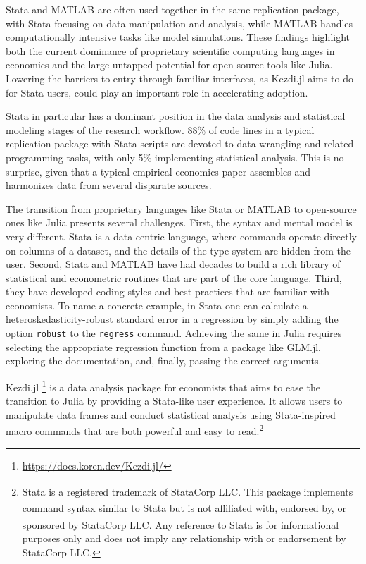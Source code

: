 \documentclass{juliacon}
\begin{document}
Stata and MATLAB are often used together in the same replication package, with Stata focusing on data manipulation and analysis, while MATLAB handles computationally intensive tasks like model simulations. These findings highlight both the current dominance of proprietary scientific computing languages in economics and the large untapped potential for open source tools like Julia. Lowering the barriers to entry through familiar interfaces, as Kezdi.jl aims to do for Stata users, could play an important role in accelerating adoption.

Stata in particular has a dominant position in the data analysis and statistical modeling stages of the research workflow. 88\% of code lines in a typical replication package with Stata scripts are devoted to data wrangling and related programming tasks, with only 5\% implementing statistical analysis. This is no surprise, given that a typical empirical economics paper assembles and harmonizes data from several disparate sources.

The transition from proprietary languages like Stata or MATLAB to open-source ones like Julia presents several challenges. First, the syntax and mental model is very different. Stata is a data-centric language, where commands operate directly on columns of a dataset, and the details of the type system are hidden from the user. Second, Stata and MATLAB have had decades to build a rich library of statistical and econometric routines that are part of the core language. Third, they have developed coding styles and best practices that are familiar with economists. To name a concrete example, in Stata one can calculate a heteroskedasticity-robust standard error in a regression by simply adding the option \texttt{robust} to the \texttt{regress} command. Achieving the same in Julia requires selecting the appropriate regression function from a package like GLM.jl, exploring the documentation, and, finally, passing the correct arguments.

Kezdi.jl \footnote{\url{https://docs.koren.dev/Kezdi.jl/}} is a data analysis package for economists that aims to ease the transition to Julia by providing a Stata-like user experience. It allows users to manipulate data frames and conduct statistical analysis using Stata-inspired macro commands that are both powerful and easy to read.\footnote{Stata\textsuperscript{\textregistered} is a registered trademark of StataCorp LLC. This package implements command syntax similar to Stata\textsuperscript{\textregistered} but is not affiliated with, endorsed by, or sponsored by StataCorp LLC. Any reference to Stata\textsuperscript{\textregistered} is for informational purposes only and does not imply any relationship with or endorsement by StataCorp LLC.}
\end{document}
